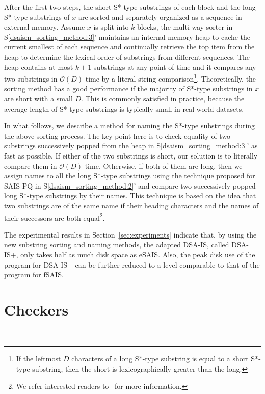 \documentclass[10pt,journal,compsoc]{IEEEtran}
\begin{document}
After the first two steps, the short S*-type substrings of each block and the long S*-type substrings of $x$ are sorted and separately organized as a sequence in external memory. Assume $x$ is split into $k$ blocks, the multi-way sorter in S\ref{dsaism_sorting_method:3}' maintains an internal-memory heap to cache the current smallest of each sequence and continually retrieve the top item from the heap to determine the lexical order of substrings from different sequences. The heap contains at most $k + 1$ substrings at any point of time and it compares any two substrings in $\mathcal{O}(D)$ time by a literal string comparison\footnote{If the leftmost $D$ characters of a long S*-type substring is equal to a short S*-type substring, then the short is lexicographically greater than the long.}. Theoretically, the sorting method has a good performance if the majority of S*-type substrings in $x$ are short with a small $D$. This is commonly satisfied in practice, because the average length of S*-type substrings is typically small in real-world datasets.

In what follows, we describe a method for naming the S*-type substrings during the above sorting process. The key point here is to check equality of two substrings successively popped from the heap in S\ref{dsaism_sorting_method:3}' as fast as possible. If either of the two substrings is short, our solution is to literally compare them in $\mathcal{O}(D)$ time. Otherwise, if both of them are long, then we assign names to all the long S*-type substrings using the technique proposed for SAIS-PQ in S\ref{dsaism_sorting_method:2}' and compare two successively popped long S*-type substrings by their names. This technique is based on the idea that two substrings are of the same name if their heading characters and the names of their successors are both equal\footnote{We refer interested readers to~\cite{Liu15} for more information.}.

The experimental results in Section~\ref{sec:experiments} indicate that, by using the new substring sorting and naming methods, the adapted DSA-IS, called DSA-IS+, only takes half as much disk space as eSAIS. Also, the peak disk use of the program for DSA-IS+ can be further reduced to a level comparable to that of the program for fSAIS.

\section{Checkers}~\label{sec:checkers}
\end{document}
